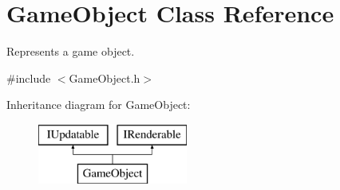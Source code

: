 \hypertarget{class_game_object}{}\section{Game\+Object Class Reference}
\label{class_game_object}


Represents a game object.  




{\ttfamily \#include $<$Game\+Object.\+h$>$}

Inheritance diagram for Game\+Object\+:\begin{figure}[H]
\begin{center}
\leavevmode
\includegraphics[height=2.000000cm]{class_game_object}
\end{center}
\end{figure}
